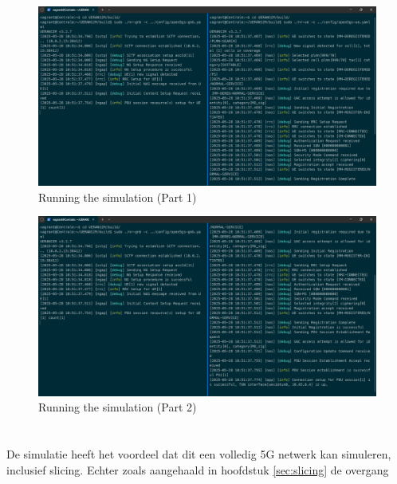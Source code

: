 \begin{figure}[H]
    \includegraphics[width=\linewidth]{../graphics/POC-Run-1.png}
    \caption{Running the simulation (Part 1)}
    \label{fig:runPart1}
\end{figure}
\begin{figure}[H]
    \includegraphics[width=\linewidth]{../graphics/POC-Run-2.png}
    \caption{Running the simulation (Part 2)}
    \label{fig:runPart2}
\end{figure}

\section{}%
\label{sec:addFeature}%

De simulatie heeft het voordeel dat dit een volledig 5G netwerk kan simuleren, inclusief slicing. Echter zoals aangehaald in hoofdstuk \ref{sec:slicing} de overgang 


